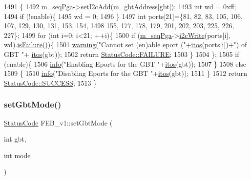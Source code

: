 \begin{DoxyCode}
1491                                                         \{
1492   \hyperlink{classFEB__v1_a6c7804ac86796f233a8393043adf2e77}{m\_seqPga}->\hyperlink{classSeqPGA_a4ef334e4d2cb417b49033dce951728cd}{setI2cAdd}(\hyperlink{classFEB__v1_ac625855df976f16694178f1a4c0eef1e}{m\_gbtAddress}[gbt]);
1493   \textcolor{keywordtype}{int} wd = 0xff;
1494   \textcolor{keywordflow}{if} (!enable)\{
1495     wd = 0;
1496   \}
1497   \textcolor{keywordtype}{int} ports[21]=\{81, 82, 83, 105, 106, 107, 129, 130, 131, 153, 154,
1498          155, 177, 178, 179, 201, 202, 203, 225, 226, 227\};
1499   \textcolor{keywordflow}{for} (\textcolor{keywordtype}{int} i=0; i<21; ++i)\{
1500     \textcolor{keywordflow}{if} (\hyperlink{classFEB__v1_a6c7804ac86796f233a8393043adf2e77}{m\_seqPga}->\hyperlink{classSeqPGA_a429076ca3a4ece94182bd95c623bb9d0}{i2cWrite}(ports[i], wd).\hyperlink{classStatusCode_a5dd22dc6eb2c52fc4cabc58f6dea2eb7}{isFailure}())\{
1501       \hyperlink{classObject_a65cd4fda577711660821fd2cd5a3b4c9}{warning}(\textcolor{stringliteral}{"Cannot set (en)able eport ("}+\hyperlink{Tools_8h_af330027dbdafb9a30768b3613c553e60}{itos}(ports[i])+\textcolor{stringliteral}{") of GBT "}+
      \hyperlink{Tools_8h_af330027dbdafb9a30768b3613c553e60}{itos}(gbt));
1502       \textcolor{keywordflow}{return} \hyperlink{classStatusCode_a6f565cbeadc76d14c72f047e5e85eb4ba3da73d4c469762eb9d3c960368252b26}{StatusCode::FAILURE};
1503     \}
1504   \};
1505   \textcolor{keywordflow}{if} (enable)\{
1506     \hyperlink{classObject_a644fd329ea4cb85f54fa6846484b84a8}{info}(\textcolor{stringliteral}{"Enabling Eports for the GBT "}+\hyperlink{Tools_8h_af330027dbdafb9a30768b3613c553e60}{itos}(gbt));
1507   \}
1508   \textcolor{keywordflow}{else}
1509   \{
1510     \hyperlink{classObject_a644fd329ea4cb85f54fa6846484b84a8}{info}(\textcolor{stringliteral}{"Disabling Eports for the GBT "}+\hyperlink{Tools_8h_af330027dbdafb9a30768b3613c553e60}{itos}(gbt));
1511   \}
1512   \textcolor{keywordflow}{return} \hyperlink{classStatusCode_a6f565cbeadc76d14c72f047e5e85eb4badd0da38d3ba0d922efd1f4619bc37ad8}{StatusCode::SUCCESS};
1513 \}
\end{DoxyCode}
\mbox{\label{classFEB__v1_a849040ff2fa8275b1a47e7be3915ebf4}} 
\subsubsection{\texorpdfstring{set\+Gbt\+Mode()}{setGbtMode()}}
{\footnotesize\ttfamily \hyperlink{classStatusCode}{Status\+Code} F\+E\+B\+\_\+v1\+::set\+Gbt\+Mode (\begin{DoxyParamCaption}\item[{int}]{gbt,  }\item[{int}]{mode }\end{DoxyParamCaption})}



